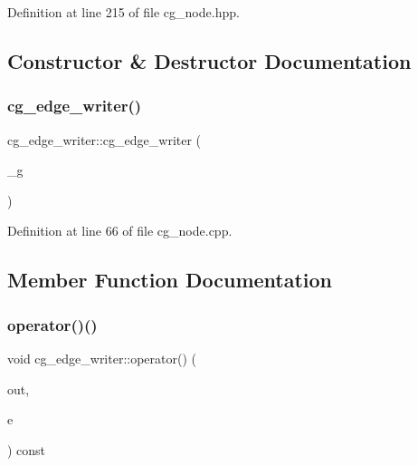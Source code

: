 Definition at line 215 of file cg\+\_\+node.\+hpp.



\subsection{Constructor \& Destructor Documentation}
\mbox{\label{classcg__edge__writer_af5dd28b83c9546f86749eb3d380e2581}} 
\subsubsection{\texorpdfstring{cg\+\_\+edge\+\_\+writer()}{cg\_edge\_writer()}}
{\footnotesize\ttfamily cg\+\_\+edge\+\_\+writer\+::cg\+\_\+edge\+\_\+writer (\begin{DoxyParamCaption}\item[{const \hyperlink{structgraph}{graph} $\ast$}]{\+\_\+g }\end{DoxyParamCaption})\hspace{0.3cm}{\ttfamily [explicit]}}



Definition at line 66 of file cg\+\_\+node.\+cpp.



\subsection{Member Function Documentation}
\mbox{\label{classcg__edge__writer_a58cc1053c3492554ccad8e6eb2dea459}} 
\subsubsection{\texorpdfstring{operator()()}{operator()()}}
{\footnotesize\ttfamily void cg\+\_\+edge\+\_\+writer\+::operator() (\begin{DoxyParamCaption}\item[{std\+::ostream \&}]{out,  }\item[{const \hyperlink{graph_8hpp_a9eb9afea34e09f484b21f2efd263dd48}{Edge\+Descriptor} \&}]{e }\end{DoxyParamCaption}) const}



